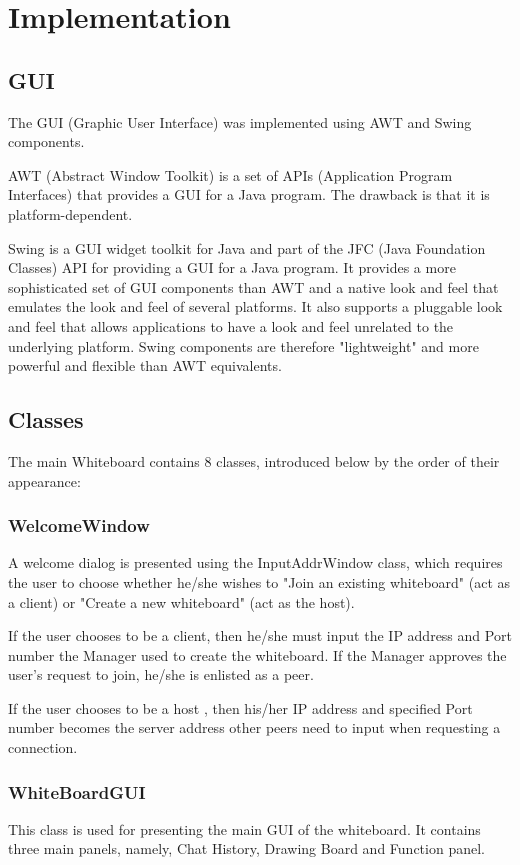 \chapter{Implementation}
\section{GUI}
The GUI (Graphic User Interface) was implemented using AWT and Swing components.

\noindent AWT (Abstract Window Toolkit) is a set of APIs (Application Program Interfaces) that provides a GUI for a Java program. The drawback is that it is platform-dependent.

\noindent Swing is a GUI widget toolkit for Java and part of the JFC (Java Foundation Classes) API for providing a GUI for a Java program. It provides a more sophisticated set of GUI components than AWT and a native look and feel that emulates the look and feel of several platforms. It also supports a pluggable look and feel that allows applications to have a look and feel unrelated to the underlying platform. Swing components are therefore "lightweight" and more powerful and flexible than AWT equivalents.

\section{Classes}
The main Whiteboard contains 8 classes, introduced below by the order of their appearance:
\subsection{WelcomeWindow}
A welcome dialog is presented using the InputAddrWindow class, which requires the user to choose whether he/she wishes to "Join an existing whiteboard" (act as a client) or "Create a new whiteboard" (act as the host).

\noindent If the user chooses to be a client, then he/she must input the IP address and Port number the Manager used to create the whiteboard. If the Manager approves the user's request to join, he/she is enlisted as a peer.

\noindent If the user chooses to be a host , then his/her IP address and specified Port number becomes the server address other peers need to input when requesting a connection. 
\subsection{WhiteBoardGUI}
This class is used for presenting the main GUI of the whiteboard. It contains three main panels, namely, Chat History, Drawing Board and Function panel.

